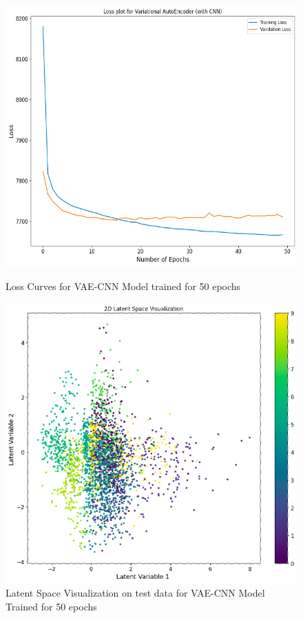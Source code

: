 \documentclass[12pt]{article}
\begin{document}
\begin{figure}[htbp]
    \centering
    \begin{minipage}[b]{0.45\linewidth}
        \centering
        \includegraphics[width=\linewidth]{50c.png}
        \caption{Loss Curves for VAE-CNN Model trained for 50 epochs}
        \label{fig:gen_stft}
    \end{minipage}
    \hfill
    \begin{minipage}[b]{0.45\linewidth}
        \centering
        \includegraphics[width=\linewidth]{50clat.png}
        \caption{Latent Space Visualization on test data for VAE-CNN Model Trained for 50 epochs}
        \label{fig:generated_audio}
    \end{minipage}
\end{figure}
\end{document}
